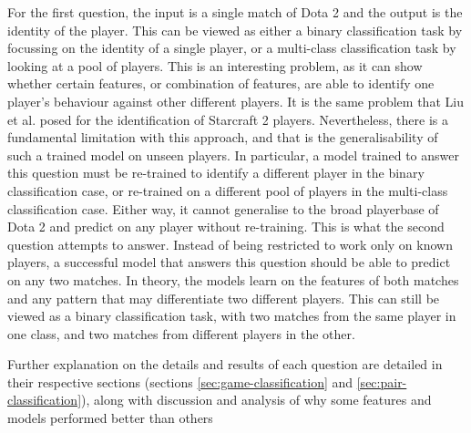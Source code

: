 \documentclass[Report.tex]{subfiles}
\begin{document}
For the first question, the input is a single match of Dota 2 and the output is the identity of the player. This can be viewed as either a binary classification task by focussing on the identity of a single player, or a multi-class classification task by looking at a pool of players. This is an interesting problem, as it can show whether certain features, or combination of features, are able to identify one player's behaviour against other different players. It is the same problem that Liu et al. \cite{starcraft-identification} posed for the identification of Starcraft 2 players. Nevertheless, there is a fundamental limitation with this approach, and that is the generalisability of such a trained model on unseen players. In particular, a model trained to answer this question must be re-trained to identify a different player in the binary classification case, or re-trained on a different pool of players in the multi-class classification case. Either way, it cannot generalise to the broad playerbase of Dota 2 and predict on any player without re-training. This is what the second question attempts to answer. Instead of being restricted to work only on known players, a successful model that answers this question should be able to predict on any two matches. In theory, the models learn on the features of both matches and any pattern that may differentiate two different players. This can still be viewed as a binary classification task, with two matches from the same player in one class, and two matches from different players in the other. 

Further explanation on the details and results of each question are detailed in their respective sections (sections \ref{sec:game-classification} and \ref{sec:pair-classification}), along with discussion and analysis of why some features and models performed better than others 
\end{document}
